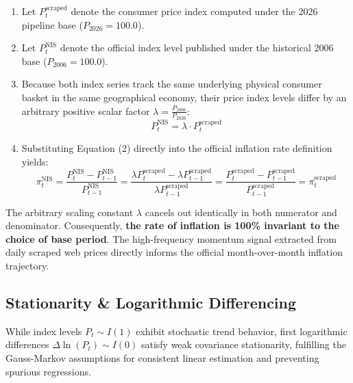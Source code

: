 \documentclass[11pt,a4paper]{article}
\begin{document}
\begin{enumerate}
    \item Let $P_t^{\text{scraped}}$ denote the consumer price index computed under the 2026 pipeline base ($P_{2026} = 100.0$).
    \item Let $P_t^{\text{NIS}}$ denote the official index level published under the historical 2006 base ($P_{2006} = 100.0$).
    \item Because both index series track the same underlying physical consumer basket in the same geographical economy, their price index levels differ by an arbitrary positive scalar factor $\lambda = \frac{P_{2006}}{P_{2026}}$:
    \begin{equation}
        P_t^{\text{NIS}} = \lambda \cdot P_t^{\text{scraped}}
    \end{equation}
    \item Substituting Equation (2) directly into the official inflation rate definition yields:
    \begin{equation}
        \pi_t^{\text{NIS}} = \frac{P_t^{\text{NIS}} - P_{t-1}^{\text{NIS}}}{P_{t-1}^{\text{NIS}}} = \frac{\lambda P_t^{\text{scraped}} - \lambda P_{t-1}^{\text{scraped}}}{\lambda P_{t-1}^{\text{scraped}}} = \frac{P_t^{\text{scraped}} - P_{t-1}^{\text{scraped}}}{P_{t-1}^{\text{scraped}}} = \pi_t^{\text{scraped}}
    \end{equation}
\end{enumerate}

\begin{calloutbox}
The arbitrary scaling constant $\lambda$ cancels out identically in both numerator and denominator. Consequently, \textbf{the rate of inflation is 100\% invariant to the choice of base period}. The high-frequency momentum signal extracted from daily scraped web prices directly informs the official month-over-month inflation trajectory.
\end{calloutbox}

\subsection{Stationarity \& Logarithmic Differencing}

While index levels $P_t \sim I(1)$ exhibit stochastic trend behavior, first logarithmic differences $\Delta \ln(P_t) \sim I(0)$ satisfy weak covariance stationarity, fulfilling the Gauss-Markov assumptions for consistent linear estimation and preventing spurious regressions.
\end{document}
